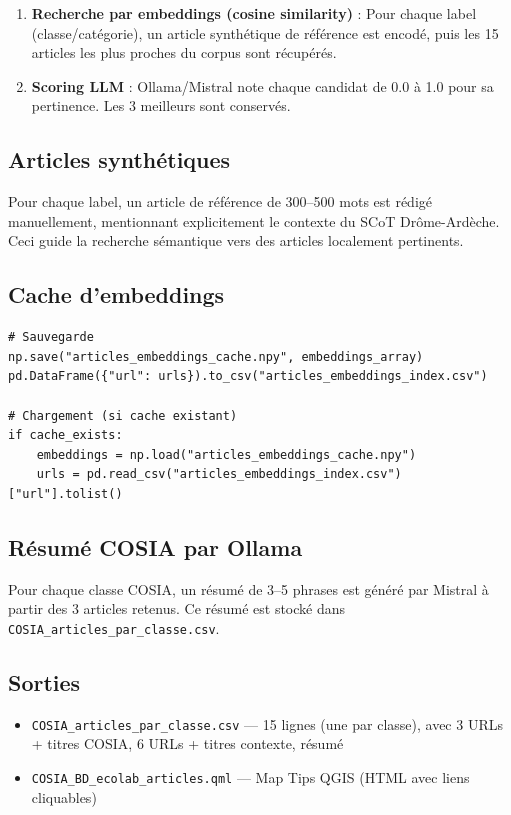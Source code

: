 \documentclass[11pt,a4paper]{report}
\newcommand{\code}[1]{\texttt{\small #1}}
\begin{document}
\begin{enumerate}
  \item \textbf{Recherche par embeddings (cosine similarity)} : Pour chaque label (classe/catégorie), un article synthétique de référence est encodé, puis les 15 articles les plus proches du corpus sont récupérés.
  \item \textbf{Scoring LLM} : Ollama/Mistral note chaque candidat de 0.0 à 1.0 pour sa pertinence. Les 3 meilleurs sont conservés.
\end{enumerate}

\subsection{Articles synthétiques}

Pour chaque label, un article de référence de 300–500 mots est rédigé manuellement, mentionnant explicitement le contexte du SCoT Drôme-Ardèche. Ceci guide la recherche sémantique vers des articles localement pertinents.

\subsection{Cache d'embeddings}

\begin{lstlisting}[language=Python3, caption={Système de cache d'embeddings}]
# Sauvegarde
np.save("articles_embeddings_cache.npy", embeddings_array)
pd.DataFrame({"url": urls}).to_csv("articles_embeddings_index.csv")

# Chargement (si cache existant)
if cache_exists:
    embeddings = np.load("articles_embeddings_cache.npy")
    urls = pd.read_csv("articles_embeddings_index.csv")["url"].tolist()
\end{lstlisting}

\subsection{Résumé COSIA par Ollama}

Pour chaque classe COSIA, un résumé de 3–5 phrases est généré par Mistral à partir des 3 articles retenus. Ce résumé est stocké dans \code{COSIA\_articles\_par\_classe.csv}.

\subsection{Sorties}

\begin{itemize}
  \item \code{COSIA\_articles\_par\_classe.csv} — 15 lignes (une par classe), avec 3 URLs + titres COSIA, 6 URLs + titres contexte, résumé
  \item \code{COSIA\_BD\_ecolab\_articles.qml} — Map Tips QGIS (HTML avec liens cliquables)
\end{itemize}
\end{document}
